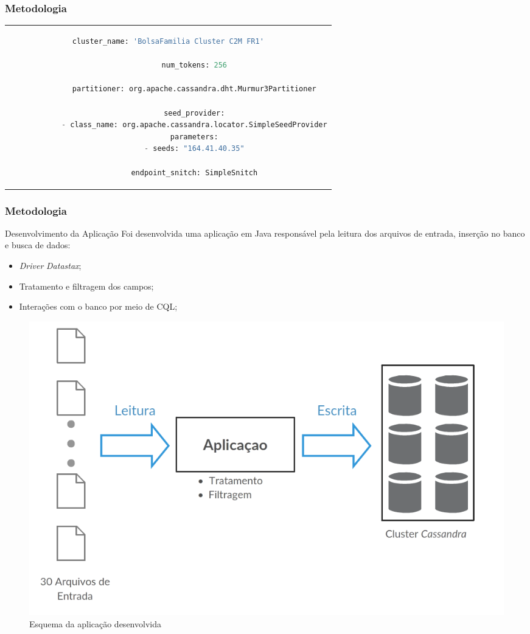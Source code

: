 \documentclass[brazil]{beamer}
\begin{document}
\begin{frame}[fragile]
	\frametitle{Metodologia}
		\begin{tabular}{c}
			\begin{lstlisting}[caption={Configuração cassandra.yaml},language=python]
			cluster_name: 'BolsaFamilia Cluster C2M FR1'
			
			num_tokens: 256
			
			partitioner: org.apache.cassandra.dht.Murmur3Partitioner
			
			seed_provider:
			- class_name: org.apache.cassandra.locator.SimpleSeedProvider
			parameters:
			- seeds: "164.41.40.35"
			
			endpoint_snitch: SimpleSnitch
			\end{lstlisting}
		\end{tabular}
\end{frame}

\begin{frame}
	\frametitle{Metodologia}
	
	\begin{block}{Desenvolvimento da Aplicação}
		Foi desenvolvida uma aplicação em Java responsável pela leitura dos arquivos de entrada, inserção no banco e busca de dados:
		\begin{itemize}
			\item \emph{Driver} \emph{Datastax};
			\item Tratamento e filtragem dos campos;
			\item Interações com o banco por meio de CQL;
		\end{itemize}
	
		 \begin{figure}
			\includegraphics[width=0.7\linewidth]{figuras/aplicacao.png}
			\caption{Esquema da aplicação desenvolvida}
		\end{figure}
	\end{block}
\end{frame}
\end{document}
